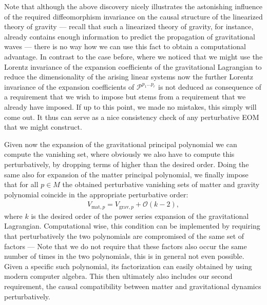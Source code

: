 Note that although the above discovery nicely illustrates the astonishing influence of the required diffeomorphism invariance on the causal structure of the linearized theory of gravity --- recall that such a linearized theory of gravity, for instance, already contains enough information to predict the propagation of gravitational waves --- there is no way how we can use this fact to obtain a computational advantage. In contrast to the case before, where we noticed that we might use the Lorentz invariance of the expansion coefficients of the gravitational Lagrangian to reduce the dimensionality of the arising linear systems now the further Lorentz invariance of the expansion coefficients of $\mathcal{P}^{p_1...p_r}$ is not deduced as consequence of a requirement that we wish to impose but stems from a  requirement that we already have imposed. If up to this point, we made no mistakes, this simply will come out. It thus can serve as a nice consistency check of any perturbative EOM that we might construct.

Given now the expansion of the gravitational principal polynomial we can compute the vanishing set, where obviously we also have to compute this perturbatively, by dropping terms of higher than the desired order. Doing the same also for expansion of the matter principal polynomial, we finally impose that for all $p \in M$ the obtained perturbative vanishing sets of matter and gravity polynomial coincide in the appropriate perturbative order:
\begin{align}
  V_{\text{mat},p} = V_{\text{grav},p} + \mathcal{O}(k-2),
\end{align}
where $k$ is the desired order of the power series expansion of the gravitational Lagrangian.
Computational wise, this condition can be implemented by requiring that perturbatively the two polynomials are compromised of the same set of factors --- Note that we do not require that these factors also occur the same number of times in the two polynomials, this is in general not even possible.
Given a specific such polynomial, its factorization can easily obtained by using modern computer algebra.
This then ultimately also includes our second requirement, the causal compatibility between matter and gravitational dynamics perturbatively. 

